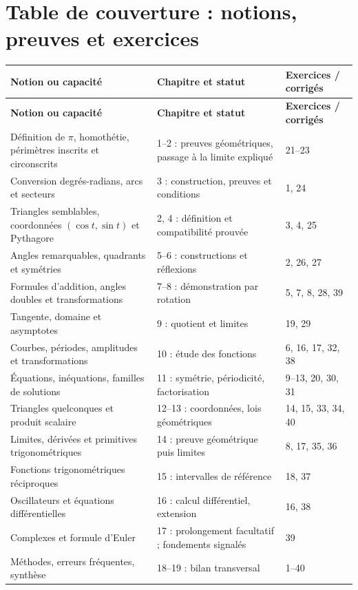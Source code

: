 \documentclass[11pt,a4paper,oneside]{book}
\begin{document}
\section{Table de couverture : notions, preuves et exercices}
\small
\begin{longtable}{p{}p{}p{}}
\toprule
\textbf{Notion ou capacité} & \textbf{Chapitre et statut} & \textbf{Exercices / corrigés}\\
\midrule\endfirsthead
\toprule\textbf{Notion ou capacité} & \textbf{Chapitre et statut} & \textbf{Exercices / corrigés}\\\midrule\endhead
Définition de $\pi$, homothétie, périmètres inscrits et circonscrits & 1--2 : preuves géométriques, passage à la limite expliqué & 21--23\\
Conversion degrés-radians, arcs et secteurs & 3 : construction, preuves et conditions & 1, 24\\
Triangles semblables, coordonnées $(\cos t,\sin t)$ et Pythagore & 2, 4 : définition et compatibilité prouvée & 3, 4, 25\\
Angles remarquables, quadrants et symétries & 5--6 : constructions et réflexions & 2, 26, 27\\
Formules d'addition, angles doubles et transformations & 7--8 : démonstration par rotation & 5, 7, 8, 28, 39\\
Tangente, domaine et asymptotes & 9 : quotient et limites & 19, 29\\
Courbes, périodes, amplitudes et transformations & 10 : étude des fonctions & 6, 16, 17, 32, 38\\
Équations, inéquations, familles de solutions & 11 : symétrie, périodicité, factorisation & 9--13, 20, 30, 31\\
Triangles quelconques et produit scalaire & 12--13 : coordonnées, lois géométriques & 14, 15, 33, 34, 40\\
Limites, dérivées et primitives trigonométriques & 14 : preuve géométrique puis limites & 8, 17, 35, 36\\
Fonctions trigonométriques réciproques & 15 : intervalles de référence & 18, 37\\
Oscillateurs et équations différentielles & 16 : calcul différentiel, extension & 16, 38\\
Complexes et formule d'Euler & 17 : prolongement facultatif ; fondements signalés & 39\\
Méthodes, erreurs fréquentes, synthèse & 18--19 : bilan transversal & 1--40\\
\bottomrule
\end{longtable}
\normalsize
\end{document}
